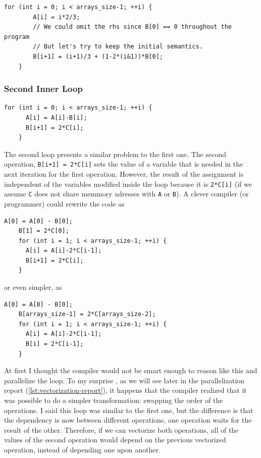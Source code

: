 \documentclass[
    12pt, %
]{fphw}
\newcommand{\tech}{\texttt}
\begin{document}
\begin{lstlisting}[gobble=4]
    for (int i = 0; i < arrays_size-1; ++i) {
        A[i] = i*2/3;
        // We could omit the rhs since B[0] == 0 throughout the program
        // But let's try to keep the initial semantics.
        B[i+1] = (i+1)/3 + (1-2*(i&1))*B[0];
    }

\end{lstlisting}

\subsubsection{Second Inner Loop}

\begin{lstlisting}[gobble=4]
    for (int i = 0; i < arrays_size-1; ++i) {
      A[i] = A[i]-B[i];
      B[i+1] = 2*C[i];
    }

\end{lstlisting}

    The second loop presents a similar problem to the first one.
The second operation, \tech{B[i+1] = 2*C[i]} sets the value of a variable
that is needed in the next iteration for the first operation.
However, the result of the assignment is
independent of the variables modified inside the loop
because it is \tech{2*C[i]}
(if we assume \tech{C} does not share memmory adresses with \tech{A} or \tech{B}).
A clever compiler (or programmer) could rewrite the code as

\begin{lstlisting}[gobble=4]
    A[0] = A[0] - B[0];
    B[1] = 2*C[0];
    for (int i = 1; i < arrays_size-1; ++i) {
      A[i] = A[i]-2*C[i-1];
      B[i+1] = 2*C[i];
    }

\end{lstlisting}

\noindent
or even simpler, as

\begin{lstlisting}[gobble=4]
    A[0] = A[0] - B[0];
    B[arrays_size-1] = 2*C[arrays_size-2];
    for (int i = 1; i < arrays_size-1; ++i) {
      A[i] = A[i]-2*C[i-1];
      B[i] = 2*C[i-1];
    }

\end{lstlisting}

    At first I thought the compiler would not be smart enough
to reason like this and parallelize the loop.
To my surprise
    , as we will see later in the parallelization report
(\cref{lst:vectorization-report}),
it happens that the compiler realized that it was possible to do a simpler transformation:
swapping the order of the operations.
I said this loop was similar to the first one,
but the difference is that the dependency is now between different operations,
one operation waits for the result of the other.
Therefore, if we can vectorize both operations,
all of the values of the second operation would depend on the previous vectorized operation,
instead of depending one upon another.
\end{document}
